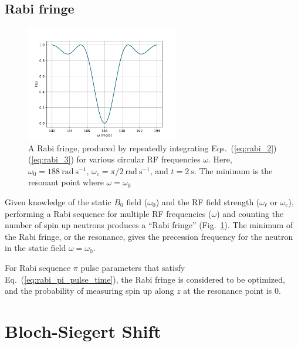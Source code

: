
\subsection{Rabi fringe}\label{sec:rabi_fringe}


\begin{figure}
    \centering
    \includegraphics[width=0.6\textwidth]{figures/rabi_circ.pdf}
    \caption{A Rabi fringe, produced by repeatedly integrating Eqs.~(\ref{eq:rabi_2})\textendash (\ref{eq:rabi_3}) for various circular RF frequencies $\omega$. Here, $\omega_0=\qty{188}{\radian\ \s^{-1}}$, $\omega_\text{c}=\pi/\qty{2}{\radian\ \s^{-1}}$, and $t=\qty{2}{\s}$. The minimum is the resonant point where $\omega=\omega_0$}
    \label{fig:rabi_fringe_circ}
\end{figure}

Given knowledge of the static $B_0$ field ($\omega_0$) and the RF field strength ($\omega_\ell\text{ or }\omega_\text{c}$), performing a Rabi sequence for multiple RF frequencies ($\omega$) and counting the number of spin up neutrons produces a ``Rabi fringe'' (Fig.~\ref{fig:rabi_fringe_circ}). The minimum of the Rabi fringe, or the resonance, gives the precession frequency for the neutron in the static field $\omega=\omega_0$. 

For Rabi sequence $\pi$ pulse parameters that satisfy Eq.~(\ref{eq:rabi_pi_pulse_time}), the Rabi fringe is considered to be optimized, and the probability of measuring spin up along $z$ at the resonance point is 0.



\section{Bloch-Siegert Shift}\label{sec:bloch-siegert}

